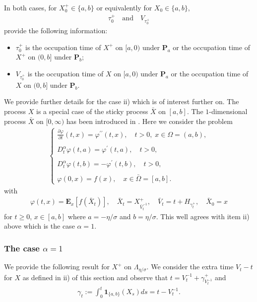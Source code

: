 \documentclass[10pt,a4paper]{article}
\numberwithin{equation}{section}
\theoremstyle{plain}
\theoremstyle{remark}
\begin{document}
In both cases, for $X^+_0 \in \{a, b\}$ or equivalently for $X_0 \in \{a, b\}$,  
\begin{align*}
\tau^+_0 \quad \textrm{and} \quad V_{\tau^+_0}
\end{align*}
provide the following information:
\begin{itemize}
\item $\tau^+_0$ is the occupation time of $X^+$ on $[a, 0)$ under $\mathbf{P}_a$ or the occupation time of $X^+$ on $(0, b]$ under $\mathbf{P}_b$;
\item $V_{\tau^+_0}$ is the occupation time of $X$ on $[a, 0)$ under $\mathbf{P}_a$ or the occupation time of $X$ on $(0, b]$ under $\mathbf{P}_b$.
\end{itemize}
 
We provide further details for the case ii) which is of interest further on. The process $X$ is a special case of the sticky process $\bar{X}$ on $[a,b]$. The $1$-dimensional process $\bar{X}$ on $[0, \infty)$ has been introduced in \cite{Dov22, NLBVP-ItheHline}. Here we consider the problem
\begin{align}
\left\lbrace
\begin{array}{l}
\displaystyle \frac{\partial \varphi}{\partial t}(t,x) = \varphi^{\prime \prime}(t,x), \quad t>0, \; x \in \Omega =(a,b), \\
\\
\displaystyle D^\alpha_t \varphi(t,a) = \varphi^\prime(t,a), \quad t>0, \\
\\
\displaystyle D^\alpha_t \varphi(t,b) = - \varphi^\prime(t,b), \quad t>0,\\
\\
\displaystyle \varphi(0,x) = f(x), \quad x \in \bar{\Omega} = [a,b].
\end{array}
\right .
\end{align}
with 
\begin{align*}
\varphi(t,x) = \mathbf{E}_x[f(\bar{X}_t)], \quad \bar{X}_t = X^+_{\bar{V}^{-1}_t}, \quad \bar{V}_t = t + H_{\gamma^+_t}, \quad \bar{X}_0=x
\end{align*}
for $t\geq 0$, $x \in [a,b]$ where $a=-\eta/\sigma$ and $b=\eta/\sigma$. This well agrees with item ii) above which is the case $\alpha=1$.

 



\subsubsection{The case $\alpha=1$}  We provide the following result for $X^+$ on $\Lambda_{\eta/\sigma}$. We consider the extra time $V_t -t$ for $X$ as defined in ii) of this section and observe that $t=V^{-1}_t + \gamma^+_{V^{-1}_t}$ and
\begin{align*}
\gamma_t := \int_0^t \mathbf{1}_{\{a, b\}}(X_s) ds = t - V^{-1}_t.
\end{align*}
\end{document}
